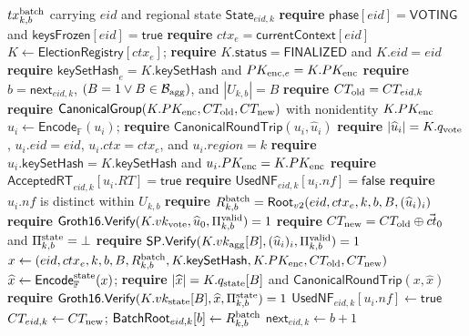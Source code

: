 \documentclass[pdflatex,sn-mathphys-num]{sn-jnl}%
\theoremstyle{thmstyleone}%
\theoremstyle{thmstyletwo}%
\theoremstyle{thmstylethree}%
\begin{document}
\begin{algorithm}[H]
\caption{$\mathsf{SubmitBatch}(tx^{\rm batch}_{k,b})$}
\label{alg:submit-batch}
\begin{algorithmic}[1]
\Require $tx^{\rm batch}_{k,b}$ carrying $eid$ and regional state $\mathsf{State}_{eid,k}$
\State \textbf{require} $\mathsf{phase}[eid]=\mathsf{VOTING}$ and $\mathsf{keysFrozen}[eid]=\mathsf{true}$
\State \textbf{require} $ctx_e=\mathsf{currentContext}[eid]$
\State $K\gets\mathsf{ElectionRegistry}[ctx_e]$; \textbf{require} $K.\mathsf{status}=\mathsf{FINALIZED}$ and $K.eid=eid$
\State \textbf{require} $\mathsf{keySetHash}_e=K.\mathsf{keySetHash}$ and $PK_{{\rm enc},e}=K.PK_{\rm enc}$
\State \textbf{require} $b=\mathsf{next}_{eid,k}$, $(B=1\lor B\in\mathcal B_{\rm agg})$, and $|U_{k,b}|=B$
\State \textbf{require} $CT_{\rm old}=CT_{eid,k}$
\State \textbf{require} $\mathsf{CanonicalGroup}(K.PK_{\rm enc},CT_{\rm old},CT_{\rm new})$ with nonidentity $K.PK_{\rm enc}$
  \State $\widehat u_i\gets\mathsf{Encode}_{\mathbb F}(u_i)$; \textbf{require} $\mathsf{CanonicalRoundTrip}(u_i,\widehat u_i)$
  \State \textbf{require} $|\widehat u_i|=K.q_{\rm vote}$, $u_i.eid=eid$, $u_i.ctx=ctx_e$, and $u_i.region=k$
  \State \textbf{require} $u_i.\mathsf{keySetHash}=K.\mathsf{keySetHash}$ and $u_i.PK_{\rm enc}=K.PK_{\rm enc}$
  \State \textbf{require} $\mathsf{AcceptedRT}_{eid,k}[u_i.RT]=\mathsf{true}$
  \State \textbf{require} $\mathsf{UsedNF}_{eid,k}[u_i.nf]=\mathsf{false}$
  \State \textbf{require} $u_i.nf$ is distinct within $U_{k,b}$
\EndFor
\State \textbf{require} $R^{\rm batch}_{k,b}=\mathsf{Root}_{v2}(eid,ctx_e,k,b,B,(\widehat u_i)_i)$
  \State \textbf{require} $\mathsf{Groth16.Verify}(K.vk_{\rm vote},\widehat u_0,\Pi^{\rm valid}_{k,b})=1$
  \State \textbf{require} $CT_{\rm new}=CT_{\rm old}\oplus\vec{ct}_0$ and $\Pi^{\rm state}_{k,b}=\bot$
\Else
  \State \textbf{require} $\mathsf{SP.Verify}(K.vk_{\rm agg}[B],(\widehat u_i)_i,\Pi^{\rm valid}_{k,b})=1$
  \State $x\gets(eid,ctx_e,k,b,B,R^{\rm batch}_{k,b},K.\mathsf{keySetHash},K.PK_{\rm enc},CT_{\rm old},CT_{\rm new})$
  \State $\widehat x\gets\mathsf{Encode}_{\mathbb F}^{\rm state}(x)$; \textbf{require} $|\widehat x|=K.q_{\rm state}[B]$ and $\mathsf{CanonicalRoundTrip}(x,\widehat x)$
  \State \textbf{require} $\mathsf{Groth16.Verify}(K.vk_{\rm state}[B],\widehat x,\Pi^{\rm state}_{k,b})=1$
\EndIf
{}
  \State $\mathsf{UsedNF}_{eid,k}[u_i.nf]\gets\mathsf{true}$
\EndFor
\State $CT_{eid,k}\gets CT_{\rm new}$; $\mathsf{BatchRoot}_{eid,k}[b]\gets R^{\rm batch}_{k,b}$
\State $\mathsf{next}_{eid,k}\gets b+1$
\end{algorithmic}
\end{algorithm}
\end{document}
